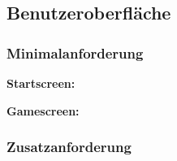 \documentclass{article}
\begin{document}
\subsection{Benutzeroberfläche}

\subsubsection{Minimalanforderung}

\textbf{Startscreen:}
\begin{figure}[h]
    \centering
\end{figure}

\textbf{Gamescreen:}
\begin{figure}[h]
    \centering
\end{figure}

\newpage

\subsubsection{Zusatzanforderung}
\end{document}
